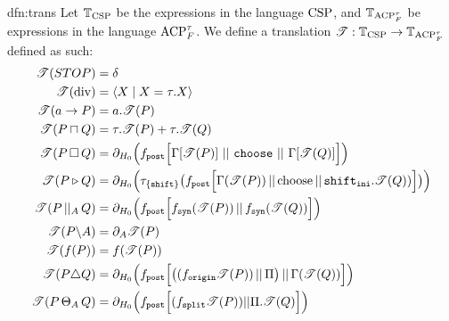 \documentclass[../hons_project.tex]{subfiles}
\begin{document}
\newpage
\begin{dfn}{dfn:trans}{}
	Let $\mathbb{T}_{\mathrm{CSP}}$ be the expressions in the language $\mathrm{CSP}$, and $\mathbb{T}_{\mathrm{ACP}_{F}^{\tau}}$ be expressions in the language $\mathrm{ACP}_{F}^{\tau}$. We define a translation $\mathscr{T} : \mathbb{T}_{\mathrm{CSP}} \to \mathbb{T}_{\mathrm{ACP}_{F}^{\tau}}$ defined as such:
	\begin{align*}
		\mathscr{T}(STOP)           & = \delta                                                                                                                        \\
		\mathscr{T}(\mathrm{div})   & = \langle X \mid X = \tau.X \rangle                                                                                             \\
		\mathscr{T}(a \to P)        & = a.\mathscr{T}(P)                                                                                                                   \\
		\mathscr{T}(P \sqcap Q) & = \tau.\mathscr{T}(P) + \tau.\mathscr{T}(Q)                                                                                               \\
		\mathscr{T}(P \,\square\, Q) & = \partial_{H_{0}}\Bigl(f_{\mathtt{post}}\Bigl[\Gamma[\mathscr{T}(P)]\, \,\vert\vert\, \,\mathtt{choose}\, \,\vert\vert\, \,\Gamma[\mathscr{T}(Q)]\Bigl]\Bigr)  \\
			\mathscr{T}(P \triangleright Q) &= \partial_{H_{0}}\Bigl(\tau_{\{\mathtt{shift}\}}\bigl(f_{\mathtt{post}}\Bigl[ \Gamma(\mathscr{T}(P)) \,\vert\vert\, \mathrm{choose} \,\vert\vert\, \mathtt{shift}_{\mathtt{ini}} . \mathscr{T}(Q)) \Bigr]\bigr)\Bigr) \\
		\mathscr{T}(P \,\vert\vert_{A}\, Q)     & = \partial_{H_{0}}\Bigl(f_{\mathtt{post}}\Bigl[f_{\mathtt{syn}}(\mathscr{T}(P)) \,\vert\vert\, f_{\mathtt{syn}}(\mathscr{T}(Q))\Bigr]\Bigr)                         \\
		\mathscr{T}(P \backslash A) & = \partial_{A}{\mathscr{T}(P)}                                                                                                       \\
		\mathscr{T}(f(P))           & = f(\mathscr{T}(P))                                                                                                                  \\
		\mathscr{T}(P \triangle Q)  & = \partial_{H_{0}}\Bigl(f_{\mathtt{post}}\Bigl[ \bigl((f_{\mathtt{origin}}\mathscr{T}(P)) \,\vert\vert\, \Pi\bigr) \,\vert\vert\, \Gamma(\mathscr{T}(Q)) \Bigr]\Bigr) \\
		\mathscr{T}(P \,\Theta_{A}\, Q) & = \partial_{H_{0}}\Bigl(f_{\mathtt{post}} \Bigl[ (f_{\mathtt{split}} \mathscr{T}(P)) | | \Pi.\mathscr{T}(Q) \Bigr]\Bigr)
	\end{align*}
\end{dfn}
\end{document}
